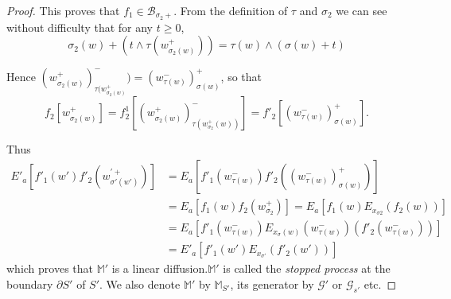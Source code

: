 \begin{proof}
This proves that $f_1 \in \mathscr{B}_{\sigma _2 +}$. From the
definition of $\tau$ and $\sigma_2$ 
we can see without difficulty that for any $t \geq 0$,
$$
\sigma_2 (w)+ (t \wedge \tau (w^+_{\sigma_2 (w)})) = \tau (w) \wedge
(\sigma (w) + t ) 
$$

Hence $(w^+_{\sigma_2 (w)}) ^-_{\tau ( w ^+_{ \sigma_2 (w)}}) = (
w^-_{\tau (w) })^+_{\sigma (w)} $, so that  
$$
f_2 [w^+_{\sigma_2(w)}] = f^1 _2 \left[ (w ^+ _{\sigma_2 (w)})
  ^-_{\tau (w^+_{\sigma_2} (w))}\right] = f'_2 \left [ (w^-_{\tau(w)})
  ^+_{\sigma (w)}\right].  
$$

Thus
\begin{align*}
E'_a \left [ f'_1 (w') f'_2 (w^{'+}_{\sigma'(w')}) \right] & = E_a
  \left[ f'_1 (w^- _{\tau (w)}) f'_2 (( w^- _{\tau (w)}) ^+_{\sigma
      (w)})\right]\\ 
  &= E_a \left[ f_1 (w) f_2 (w^+_{\sigma_2}) \right] = E_a \left[f_{1} (w)
    E_{x_{\sigma 2}}( f_2 (w))\right]\\ 
  &= E_a \left[f'_1 (w^-_{\tau (w)}) E_{x_\sigma (w)} ( w^-_{\tau
      (w)}) (f'_2 (w ^-_{\tau(w)}))\right]\\
  & = E'_a \left[ f'_1
    (w')E_{x_{\sigma'}} (f'_2 (w'))\right]  
\end{align*}\pageoriginale
which proves that $\mathbb{M}'$ is a linear diffusion.$\mathbb{M}'$ is
called the \textit{stopped process} at the boundary $\partial S'$ of
$S'$. We also denote $\mathbb{M}'$ by $\mathbb{M}_{S'}$, its generator
by $\mathscr{G}'$ or $\mathscr{G}_{s'}$ etc. 


\end{proof}

